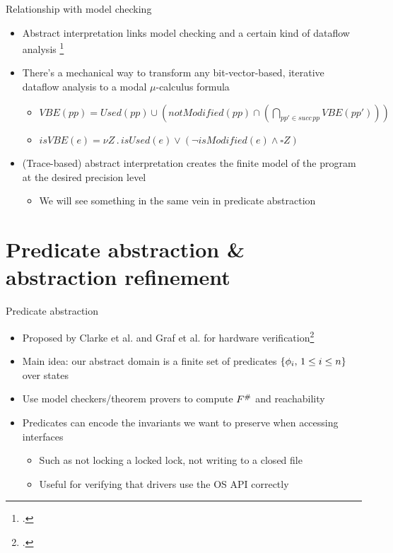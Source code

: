 \documentclass[aspectratio=169]{beamer}
\begin{document}
\begin{frame}{Relationship with model checking}
  \small{}
  \begin{itemize}[<+->]
  \item Abstract interpretation links model
    checking and a certain kind of dataflow analysis
    \footcite{schmidt1998program,schmidt1998data}
  \item There's a mechanical way to transform any bit-vector-based,
    iterative dataflow analysis to a modal $\mu$-calculus formula
    \begin{itemize}
    \item
      $VBE(pp) = Used(pp) \cup (notModified(pp) \cap (\bigcap_{pp' \in
        succ\, pp} VBE(pp')))$
      \vspace{.5em}
    \item
      $isVBE(e) = \nu Z \,.\, isUsed(e) \vee (\neg isModified(e)
      \wedge \square Z)$
    \end{itemize}
  \item (Trace-based) abstract interpretation creates the finite model of the
    program at the desired precision level
    \begin{itemize}
    \item We will see something in the same vein in predicate abstraction
    \end{itemize}
  \end{itemize}
\end{frame}

\section{Predicate abstraction \& abstraction refinement}

\begin{frame}{Predicate abstraction}
  \begin{itemize}[<+->]
  \item Proposed by Clarke et al. and Graf et al. for hardware verification\footcite{clarke1994model,graf1997construction}
  \item Main idea: our abstract domain is a finite set of predicates $\left\{\phi_i,\, 1 \le i\le n\right\}$ over states
  \item Use model checkers/theorem provers to compute $F^{\#}$ and reachability
  \item Predicates can encode the invariants we want to preserve when accessing interfaces
    \begin{itemize}
    \item Such as not locking a locked lock, not writing to a closed file
    \item Useful for verifying that drivers use the OS API correctly
    \end{itemize}
  \end{itemize}
\end{frame}
\end{document}
